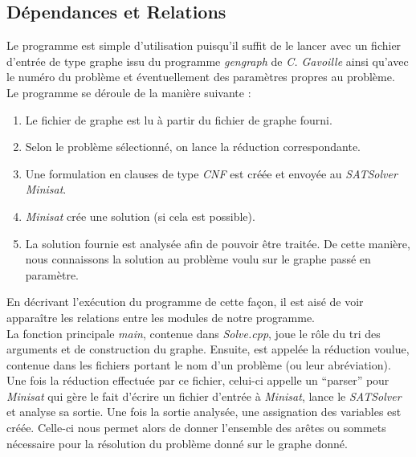   \subsection{Dépendances et Relations}
  Le programme est simple d'utilisation puisqu'il suffit de le lancer
  avec un fichier d'entrée de type graphe issu du programme
  \emph{gengraph} de \emph{C. Gavoille} ainsi qu'avec le numéro du
  problème et éventuellement des paramètres propres au problème.\\
  Le programme se déroule de la manière suivante :
  \begin{enumerate}
   \item Le fichier de graphe est lu à partir du fichier de graphe
	 fourni. 
   \item Selon le problème sélectionné, on lance la réduction
	 correspondante. 
   \item Une formulation en clauses de type \emph{CNF} est créée et
	 envoyée au \emph{SATSolver} \emph{Minisat}. 
   \item \emph{Minisat} crée une solution (si cela est possible).
   \item La solution fournie est analysée afin de pouvoir être
	 traitée. De cette manière, nous connaissons la solution au
	 problème voulu sur le graphe passé en paramètre. 
  \end{enumerate}
  
  En décrivant l'exécution du programme de cette façon, il est aisé de
  voir apparaître les relations entre les modules de notre programme.\\
  La fonction principale \emph{main}, contenue dans \emph{Solve.cpp},
  joue le rôle du tri des arguments et de construction du
  graphe. Ensuite, est appelée la réduction voulue, contenue dans les
  fichiers portant le nom d'un problème (ou leur abréviation). Une fois
  la réduction effectuée par ce fichier, celui-ci appelle un ``parser''
  pour \emph{Minisat} qui gère le fait d'écrire un fichier d'entrée à
  \emph{Minisat}, lance le \emph{SATSolver} et analyse sa sortie. Une
  fois la sortie analysée, une assignation des variables est
  créée. Celle-ci nous permet alors de donner l'ensemble des arêtes ou
  sommets nécessaire pour la résolution du problème donné sur le graphe
  donné.
